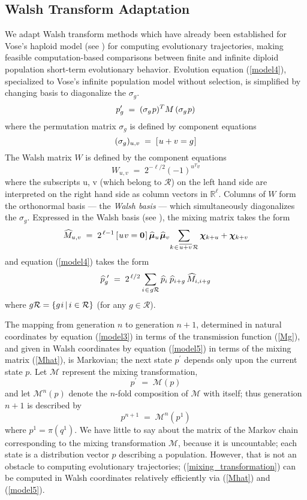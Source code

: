 \subsection{Walsh Transform Adaptation}
 We adapt Walsh transform methods which have already been
established for Vose's haploid model (see \cite{VoseWright1998})
for computing evolutionary trajectories, making feasible
computation-based comparisons between finite and infinite
diploid population short-term evolutionary behavior.
Evolution equation (\ref{model4}), 
specialized to Vose's infinite population model without selection, 
is simplified by changing basis to diagonalize the $\sigma_g$.
\[
p_g^\prime \; = \; (\sigma_g \hspace{0.01in} p)^T M \, (\sigma_g \hspace{0.01in} p)
\]
where the permutation matrix $\sigma_g$ is defined by component
equations
\[
(\sigma_g)_{u,v} \; = \; [\hspace{0.01in} u+v = g\hspace{0.01in} ]
\]
The Walsh matrix $W$ is defined by the component equations
\[
W_{u,v} \; = \; 2^{-\ell/2} (-1)^{u^T v}
\]
where the subscripts \nudge u, \nudge v (which belong to $\mathcal{R}$) on the left hand side 
are interpreted on the right hand side as column vectors in $\mathbb{R}^{\ell}$.
Columns of $W$ form the orthonormal basis --- the
{\em Walsh basis\/} --- which simultaneously diagonalizes the
$\sigma_g$. Expressed in the Walsh basis (see \cite{VoseWright1998}), the mixing matrix
takes the form
\begin{equation}
\label{Mhat}
\widehat{M}_{u,v} \; = \; 2^{\,\ell-1} \,[\hspace{0.01in} u \hspace{0.01in} v = {\bf
    0}\hspace{0.01in}]\, \widehat{\bm{\mu}}_u \hspace{0.01in} \widehat{\bm{\mu}}_v \!  \sum_{k
  \hspace{0.01in} \in \hspace{0.01in} \overline{u+v} \hspace{0.01in} \mathcal{R}} \bm{\chi}_{k + u} +
\bm{\chi}_{k + v}
\end{equation}
and equation (\ref{model4}) takes the form
\begin{equation}
\label{model5}
\widehat{p}_g^{\,\,\prime} \; = \; 2^{\,\ell/2} \sum_{i \hspace{0.01in} \in \hspace{0.01in} g \mathcal{R}}
\widehat{p}_i \, \hspace{0.01in} \widehat{p}_{i+g} \,\widehat{M}_{i,i+g}
\end{equation}
where $g \mathcal{R} = \{g \hspace{0.01in} i \, | \, i \in \mathcal{R} \}$ (for
any $g \in \mathcal{R}$).

The mapping from generation $n$ to generation $n+1$, determined in
natural coordinates by equation (\ref{model3}) in terms of the
transmission function (\ref{Mg}), and given in Walsh coordinates by
equation (\ref{model5}) in terms of the mixing matrix (\ref{Mhat}), is
Markovian; the next state $p^\prime$ depends only upon the current
state $p$.  Let $\mathcal{M}$ represent the mixing transformation,
\begin{equation} \label{mixing_transformation}
p^\prime \; = \; \mathcal{M}(p)
\end{equation}
and let $\mathcal{M}^n(p)$ denote the $n$-fold composition of
$\mathcal{M}$ with itself; thus generation $n+1$ is described by
\[
p^{n+1} \; = \; \mathcal{M}^n(p^1)
\]
where $p^1 = \pi (q^1)$.  We have little to say
about the matrix of the Markov chain corresponding to the mixing
transformation $\mathcal{M}$, because it is uncountable; each state is
a distribution vector $p$ describing a population. However, that is
not an obstacle to computing evolutionary trajectories;
(\ref{mixing_transformation}) can be computed in Walsh coordinates
relatively efficiently via (\ref{Mhat}) and (\ref{model5}).

